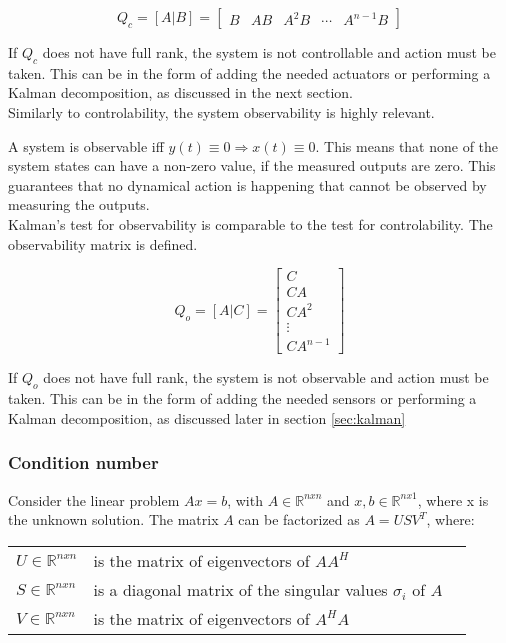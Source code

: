 \begin{equation} \label{eq:ctrb}
	Q_c = [A|B] = \begin{bmatrix}  B & AB & A^2B & \cdots & A^{n-1}B  \end{bmatrix}
\end{equation}

If $Q_c$ does not have full rank, the system is not controllable and action must be taken. This can be in the form of adding the needed actuators or performing a Kalman decomposition, as discussed in the next section.\\

Similarly to controlability, the system observability is highly relevant.

\noindent A system is observable iff $y(t) \equiv 0 \Rightarrow x(t) \equiv 0$. This means that none of the system states can have a non-zero value, if the measured outputs are zero. This guarantees that no dynamical action is happening that cannot be observed by measuring the outputs.\\

Kalman's test for observability is comparable to the test for controlability. The observability matrix is defined.

\begin{equation}
	Q_o = [A|C] = \begin{bmatrix}
		C \\ CA \\ CA^2 \\ \vdots \\ CA^{n-1}
	\end{bmatrix}
\end{equation}

If $Q_o$ does not have full rank, the system is not observable and action must be taken. This can be in the form of adding the needed sensors or performing a Kalman decomposition, as discussed later in section \cref{sec:kalman}


\subsubsection{Condition number} \label{sec:condNumber}
Consider the linear problem $Ax=b$, with $A \in \mathbb{R} ^{n x n}$ and $ x, b \in \mathbb{R} ^{n x 1}$, where x is the unknown solution. The matrix $A$ can be factorized as $A = USV^T$, where:
\begin{center}
	\begin{tabular}{l p{8cm} l}
		$U \in \mathbb{R} ^{n x n}$		& is the matrix of eigenvectors of $AA^H$  &  \\
		$S \in \mathbb{R} ^{n x n}$ 	& is a diagonal matrix of the singular values $\sigma_i$ of $A$ &  \\
		$V \in \mathbb{R} ^{n x n}$		& is the matrix of eigenvectors of $A^HA$  &  \\
	\end{tabular}
\end{center}

